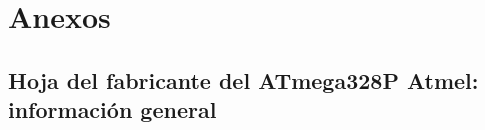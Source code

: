 \newpage
\section{Anexos}


\subsection{Hoja del fabricante del ATmega328P Atmel: información general} \label{an:01_GEN}
\vspace{\fill}
 

